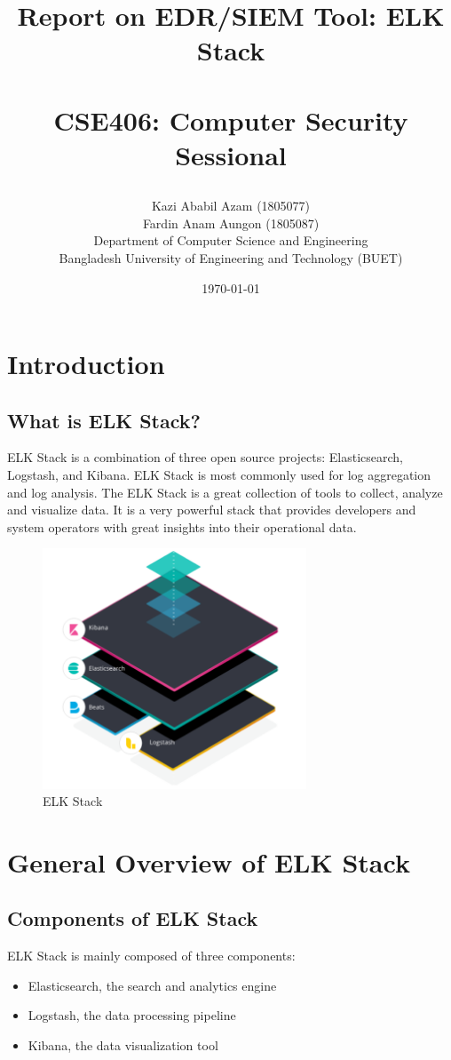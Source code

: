 \documentclass{report}
\title{
	\endgraf\bigskip
	
	\begin{center}
		\Huge {{Report on EDR/SIEM Tool: ELK Stack} }\\\\
		\vspace{0.5cm}
		\large {CSE406: Computer Security Sessional}
	\end{center}
	\bigskip
	\bigskip
}
\author{
    \large{Kazi Ababil Azam (1805077)}\\
	\large{Fardin Anam Aungon (1805087)}\\
	\large{Department of Computer Science and Engineering}\\
    \large{Bangladesh University of Engineering and Technology (BUET)}
}
\date{
	\endgraf\bigskip
	\Large{\today}
}
\begin{document}
\maketitle
\tableofcontents


\chapter{Introduction}

\section{What is ELK Stack?}
ELK Stack is a combination of three open source projects: Elasticsearch, Logstash, and Kibana. 
ELK Stack is most commonly used for log aggregation and log analysis. The ELK Stack is a great collection
of tools to collect, analyze and visualize data. It is a very powerful stack that provides developers and
system operators with great insights into their operational data.


\begin{figure}[h]
	\centering
	\includegraphics[width=0.7\textwidth]{Images/ELK_Layers.png}
	\caption{ELK Stack}
	\label{fig:Components of ELK Stack}
\end{figure} 

\chapter{General Overview of ELK Stack}
\section{Components of ELK Stack}
ELK Stack is mainly composed of three components:
\begin{itemize}
	\item Elasticsearch, the search and analytics engine
	\item Logstash, the data processing pipeline
	\item Kibana, the data visualization tool
\end{itemize}
\end{document}
